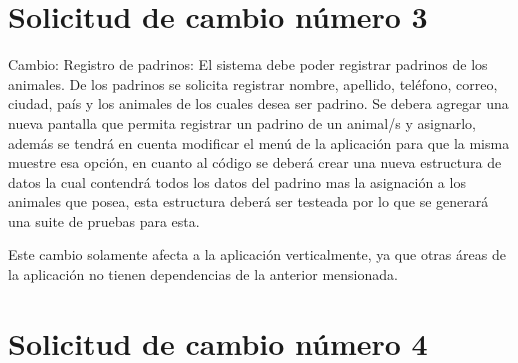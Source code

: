 \section{Solicitud de cambio número 3}
Cambio: Registro de padrinos: El sistema debe poder registrar padrinos de los animales. De los padrinos se solicita registrar nombre, apellido, teléfono, correo, ciudad, país y los animales de los cuales desea ser padrino.
Se debera agregar una nueva pantalla que permita registrar un padrino de un animal/s y asignarlo, además se tendrá en cuenta modificar el menú de la aplicación para que la misma muestre esa opción, en cuanto al código se deberá crear una nueva estructura de datos la cual contendrá todos los datos del padrino mas la asignación a los animales que posea, esta estructura deberá ser testeada por lo que se generará una suite de pruebas para esta.


Este cambio solamente afecta a la aplicación verticalmente, ya que otras áreas de la aplicación no tienen dependencias de la anterior mensionada.

\section{Solicitud de cambio número 4}

